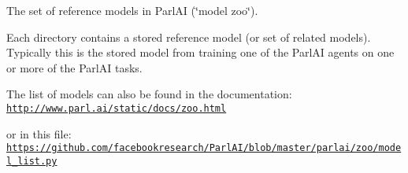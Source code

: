 The set of reference models in Parl\+AI (\char`\"{}model zoo\char`\"{}).

Each directory contains a stored reference model (or set of related models). Typically this is the stored model from training one of the Parl\+AI agents on one or more of the Parl\+AI tasks.

The list of models can also be found in the documentation\+: \href{http://www.parl.ai/static/docs/zoo.html}{\tt http\+://www.\+parl.\+ai/static/docs/zoo.\+html}

or in this file\+: \href{https://github.com/facebookresearch/ParlAI/blob/master/parlai/zoo/model_list.py}{\tt https\+://github.\+com/facebookresearch/\+Parl\+A\+I/blob/master/parlai/zoo/model\+\_\+list.\+py} 
